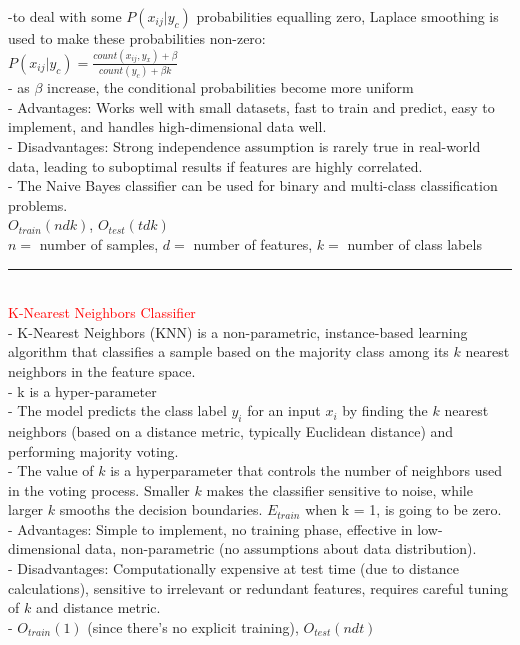 \documentclass[8pt]{extarticle}
\begin{document}
\begin{multicols*}{2}
-to deal with some $P(x_{ij} | y_c)$ probabilities equalling zero, Laplace smoothing is used to make these probabilities non-zero:
\\
$P(x_{ij} | y_c) = \frac{count(x_{ij}, y_x) + \beta}{count(y_c) + \beta k}$
\\
- as $\beta$ increase, the conditional probabilities become more uniform 
\\
- Advantages: Works well with small datasets, fast to train and predict, easy to implement, and handles high-dimensional data well.
\\
- Disadvantages: Strong independence assumption is rarely true in real-world data, leading to suboptimal results if features are highly correlated.
\\
- The Naive Bayes classifier can be used for binary and multi-class classification problems.
\\
$O_{train}(ndk)$, $O_{test}(tdk)$
\\
$n =$ number of samples, $d =$ number of features, $k = $ number of class labels
\\
\rule{\linewidth}{0.5mm} 
\\
\textcolor{red}{K-Nearest Neighbors Classifier}
\\
- K-Nearest Neighbors (KNN) is a non-parametric, instance-based learning algorithm that classifies a sample based on the majority class among its $k$ nearest neighbors in the feature space.
\\
- k is a hyper-parameter
\\
- The model predicts the class label $y_i$ for an input $x_i$ by finding the $k$ nearest neighbors (based on a distance metric, typically Euclidean distance) and performing majority voting.
\\
- The value of $k$ is a hyperparameter that controls the number of neighbors used in the voting process. Smaller $k$ makes the classifier sensitive to noise, while larger $k$ smooths the decision boundaries. $E_{train}$ when k = 1, is going to be zero.
\\
- Advantages: Simple to implement, no training phase, effective in low-dimensional data, non-parametric (no assumptions about data distribution).
\\
- Disadvantages: Computationally expensive at test time (due to distance calculations), sensitive to irrelevant or redundant features, requires careful tuning of $k$ and distance metric.
\\
- $O_{train}(1)$ (since there's no explicit training), $O_{test}(ndt)$
\\

\end{multicols*}
\end{document}
